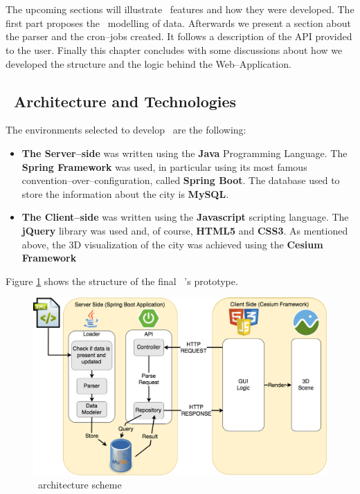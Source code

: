 \section{\applicationName} \label{projectDesign}
The upcoming sections will illustrate \applicationName\ features and how they were developed. The first part proposes the \applicationName\ modelling of data. Afterwards we present a section about the parser and the cron--jobs created. It follows a description of the API provided to the user. Finally this chapter concludes with some discussions about how we developed the structure and the logic behind the Web--Application.

\subsection{\applicationName\ Architecture and Technologies}
The environments selected to develop \applicationName\ are the following:
\begin{itemize}
	\item {\bf The Server--side} was written using the {\bf Java} Programming Language. The {\bf Spring Framework} was used, in particular using its most famous convention--over--configuration, called {\bf Spring Boot}. The database used to store the information about the city is {\bf MySQL}.
	\item {\bf The Client--side} was written using the {\bf Javascript} scripting language. The {\bf jQuery} library was used and, of course, {\bf HTML5} and {\bf CSS3}. As mentioned above, the 3D visualization of the city was achieved using the {\bf Cesium Framework}
\end{itemize}
Figure \ref{fig:project_structure} shows the structure of the final \applicationName\ 's prototype.
\begin{figure}[H]
\centering
\includegraphics[width=1.0\textwidth]{chapter3/images/project_structure}
\caption{\applicationName\ architecture scheme}
\label{fig:project_structure}
\end{figure}

